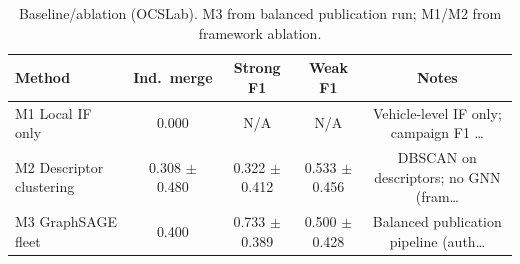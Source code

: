 \begin{table}[t]
\centering
\caption{Baseline/ablation (OCSLab). M3 from balanced publication run; M1/M2 from framework ablation.}
\label{tab:baseline_ablation}
\begin{tabular}{@{}lcccc@{}}
\toprule
Method & Ind.\ merge & Strong F1 & Weak F1 & Notes \\
\midrule
M1 Local IF only & 0.000 & N/A & N/A & Vehicle-level IF only; campaign F1 \ldots \\
M2 Descriptor clustering & 0.308 $\pm$ 0.480 & 0.322 $\pm$ 0.412 & 0.533 $\pm$ 0.456 & DBSCAN on descriptors; no GNN (fram\ldots \\
M3 GraphSAGE fleet & 0.400 & 0.733 $\pm$ 0.389 & 0.500 $\pm$ 0.428 & Balanced publication pipeline (auth\ldots \\
\bottomrule
\end{tabular}
\end{table}
